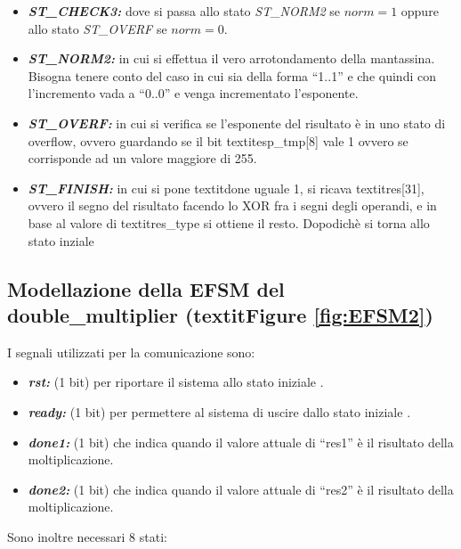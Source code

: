 \documentclass[]{IEEEtran}
\begin{document}
\begin{itemize}
    \item \textit{\textbf{ST\_CHECK3:}} dove si passa allo stato \textit{ST\_NORM2} se \(\textit{norm} = 1\) oppure allo stato \textit{ST\_OVERF} se \(\textit{norm} = 0\).
    \item \textit{\textbf{ST\_NORM2:}} in cui si effettua il vero arrotondamento della mantassina. Bisogna tenere conto del caso in cui sia della forma ``1..1'' e che quindi con l'incremento vada a ``0..0'' e  venga incrementato l'esponente.
    \item {\it\bf ST\_OVERF:} in cui si verifica se l'esponente del risultato è in uno stato di overflow, ovvero guardando se il bit textit{esp\_tmp[8]} vale 1 ovvero se corrisponde ad un valore maggiore di 255.
    \item {\it\bf ST\_FINISH:} in cui si pone textit{done} uguale 1, si ricava textit{res[31]}, ovvero il segno del risultato facendo lo XOR fra i segni degli operandi, e in base al valore di textit{res\_type} si ottiene il resto. Dopodichè si torna allo stato inziale
\end{itemize}


\subsection{Modellazione della EFSM del double\_multiplier (textit{Figure \ref{fig:EFSM2}})}
I segnali utilizzati per la comunicazione sono:
\begin{itemize}
    \item {\it\bf rst:} (1 bit) per riportare il sistema allo stato iniziale .
    \item {\it\bf ready:} (1 bit) per permettere al sistema di uscire dallo stato iniziale .
    \item {\it\bf done1:} (1 bit) che indica quando il valore attuale di ``res1'' è il risultato della moltiplicazione.
    \item {\it\bf done2:} (1 bit) che indica quando il valore attuale di ``res2'' è il risultato della moltiplicazione.
\end{itemize}

Sono inoltre necessari 8 stati:
\end{document}

